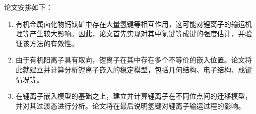 论文安排如下：

\begin{enumerate}
    \item 有机金属卤化物钙钛矿中存在大量氢键等相互作用，这可能对锂离子的输运机理等产生较大影响。因此，论文首先实现对其中氢键等成键的强度估计，并验证该方法的有效性。
    \item 由于有机阳离子具有取向，锂离子在其中存在多个不等价的嵌入位置。论文将此就建立并计算分析锂离子嵌入的稳定模型，包括几何结构、电子结构、成键情况等。
    \item 在锂离子嵌入模型的基础之上，建立并计算锂离子在不同位点间的迁移模型，并对其过渡态进行分析。论文将在最后说明氢键对锂离子输运过程的影响。
\end{enumerate}

